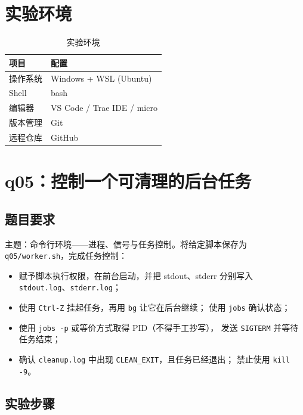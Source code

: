 \documentclass[a4paper,11pt]{ctexart}
\begin{document}
\section{实验环境}

\begin{table}[htbp]
  \centering
  \caption{实验环境}\label{tab:env}
  \begin{tabular}{ll}
    \toprule
    项目 & 配置 \\
    \midrule
    操作系统 & Windows + WSL (Ubuntu) \\
    Shell & bash \\
    编辑器 & VS Code / Trae IDE / micro \\
    版本管理 & Git \\
    远程仓库 & GitHub \\
    \bottomrule
  \end{tabular}
\end{table}

\section{q05：控制一个可清理的后台任务}

\subsection{题目要求}

主题：命令行环境——进程、信号与任务控制。将给定脚本保存为
\texttt{q05/worker.sh}，完成任务控制：
\begin{itemize}
  \item 赋予脚本执行权限，在前台启动，并把 stdout、stderr 分别写入
        \texttt{stdout.log}、\texttt{stderr.log}；
  \item 使用 \texttt{Ctrl-Z} 挂起任务，再用 \texttt{bg} 让它在后台继续；
        使用 \texttt{jobs} 确认状态；
  \item 使用 \texttt{jobs -p} 或等价方式取得 PID（不得手工抄写），
        发送 \texttt{SIGTERM} 并等待任务结束；
  \item 确认 \texttt{cleanup.log} 中出现 \texttt{CLEAN\_EXIT}，且任务已经退出；
        禁止使用 \texttt{kill -9}。
\end{itemize}

\subsection{实验步骤}
\end{document}
